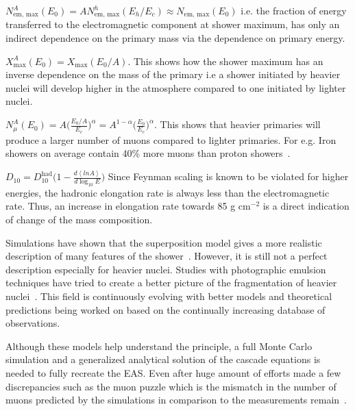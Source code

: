 \begin{description}
    \item $N_{\text{em, max}}^A(E_0) = A N_{\text{em, max}}^h(E_h/E_c) \approx N_{\text{em, max}}(E_0) $ i.e. the fraction of energy transferred to the electromagnetic component at shower maximum, has only an indirect dependence on the primary mass via the dependence on primary energy.
    \item $X_{\text{max}}^A(E_0) = X_{\text{max}}(E_0/A)$. This shows how the shower maximum has an inverse dependence on the mass of the primary i.e a shower initiated by heavier nuclei will develop higher in the atmosphere compared to one initiated by lighter nuclei.
    \item $N_{\mu}^A(E_0) =  A \biggl(\frac{E_0/A}{E_{c}}\biggr)^{\alpha} = A^{1-\alpha} \biggl(\frac{E_0}{E_c}\biggr)^{\alpha}$. This shows that heavier primaries will produce a larger number of muons compared to lighter primaries. For e.g. Iron showers on average contain 40\% more muons than proton showers~\cite{Fowler_2001}.
    \item $D_{10} = D_{10}^{\text{had}} \Biggl(1- \frac{d\left\langle ln A\right\rangle}{d\log_{10} E}\Biggr)$ Since Feynman scaling is known to be violated for higher energies, the hadronic elongation rate is always less than the electromagnetic rate. Thus, an increase in elongation rate towards 85 g cm$^{-2}$ is a direct indication of change of the mass composition. 
\end{description}
Simulations have shown that the superposition model gives a more realistic description of many features of the shower~\cite{Wibig_2022}. However, it is still not a perfect description especially for heavier nuclei. Studies with photographic emulsion techniques have tried to create a better picture of the fragmentation of heavier nuclei~\cite{LI2013503}. This field is continuously evolving with better models and theoretical predictions being worked on based on the continually increasing database of observations. 

Although these models help understand the principle, a full Monte Carlo simulation and a generalized analytical solution of the cascade equations is needed to fully recreate the EAS. Even after huge amount of efforts made a few discrepancies such as the muon puzzle which is the mismatch in the number of muons predicted by the simulations in comparison to the measurements remain~\cite{Albrecht_2022_muon_puzzle}.  

